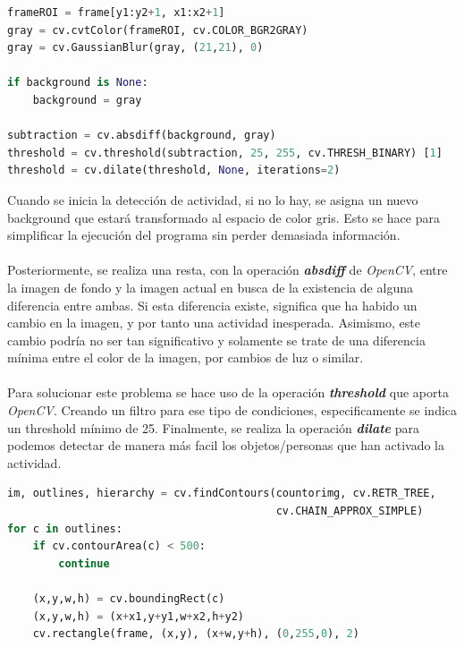 \documentclass[a4paper]{article} %
\renewcommand{\baselinestretch}{1.5}
\begin{document}
\begin{tcolorbox}[]
\begin{lstlisting}[language=Python]
frameROI = frame[y1:y2+1, x1:x2+1]
gray = cv.cvtColor(frameROI, cv.COLOR_BGR2GRAY)
gray = cv.GaussianBlur(gray, (21,21), 0)

if background is None:
    background = gray

subtraction = cv.absdiff(background, gray)
threshold = cv.threshold(subtraction, 25, 255, cv.THRESH_BINARY) [1]
threshold = cv.dilate(threshold, None, iterations=2)
\end{lstlisting}
\end{tcolorbox}

Cuando se inicia la detección de actividad, si no lo hay, se asigna un nuevo background que estará transformado al espacio de color gris. Esto se hace para simplificar la ejecución del programa sin perder demasiada información.
\\
\\
Posteriormente, se realiza una resta, con la operación \textbf{\textit{absdiff}} de \textit{OpenCV}, entre la imagen de fondo y la imagen actual en busca de la existencia de alguna diferencia entre ambas. Si esta diferencia existe, significa que ha habido un cambio en la imagen, y por tanto una actividad inesperada. Asimismo, este cambio podría no ser tan significativo y solamente se trate de una diferencia mínima entre el color de la imagen, por cambios de luz o similar.
\\
\\
Para solucionar este problema se hace uso de la operación \textbf{\textit{threshold}} que aporta \textit{OpenCV}. Creando un filtro para ese tipo de condiciones, especificamente se indica un threshold mínimo de 25. \cite{threshold} Finalmente, se realiza la operación \textbf{\textit{dilate}} para podemos detectar de manera más facil los objetos/personas que han activado la actividad.
\\ 

\renewcommand{\baselinestretch}{1}
\begin{tcolorbox}[]
\begin{lstlisting}[language=Python]
im, outlines, hierarchy = cv.findContours(countorimg, cv.RETR_TREE, 
                                          cv.CHAIN_APPROX_SIMPLE)
for c in outlines:
    if cv.contourArea(c) < 500:
        continue

    (x,y,w,h) = cv.boundingRect(c)
    (x,y,w,h) = (x+x1,y+y1,w+x2,h+y2)
    cv.rectangle(frame, (x,y), (x+w,y+h), (0,255,0), 2)
\end{lstlisting}
\end{tcolorbox}
\renewcommand{\baselinestretch}{1.5}
\end{document}
